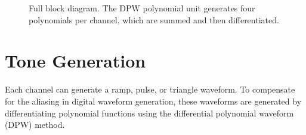 %
%
%
%
%
%

\begin{figure}[h!t]
    \centering
    
    \caption{\label{fig:block-diagram} Full block diagram.  The DPW polynomial unit generates four polynomials per channel, which are summed and then differentiated.}
\end{figure}

\section{Tone Generation}

Each channel can generate a ramp, pulse, or triangle waveform.  To compensate for the aliasing in digital waveform generation, these waveforms are generated by differentiating polynomial functions using the differential polynomial waveform (DPW) method\autocite{Valimaki2010}.


